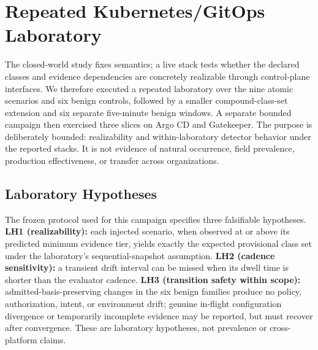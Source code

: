 \section{Repeated Kubernetes/GitOps Laboratory}
\label{sec:lab}

The closed-world study fixes semantics; a live stack tests whether the
declared classes and evidence dependencies are concretely realizable through
control-plane interfaces. We therefore executed a repeated laboratory over
the nine atomic scenarios and six benign controls, followed by a smaller
compound-class-set extension and six separate five-minute benign windows. A
separate bounded campaign then exercised three slices on Argo CD and
Gatekeeper. The purpose is deliberately bounded: realizability and
within-laboratory detector behavior under the reported stacks. It is not
evidence of natural occurrence, field prevalence,
production effectiveness, or transfer across organizations.

\subsection{Laboratory Hypotheses}
The frozen protocol used for this campaign specifies three falsifiable hypotheses.
\textbf{LH1 (realizability):} each injected scenario, when observed at or
above its predicted minimum evidence tier, yields exactly the expected
provisional class set under the laboratory's sequential-snapshot assumption.
\textbf{LH2 (cadence sensitivity):} a transient drift interval can
be missed when its dwell time is shorter than the evaluator cadence.
\textbf{LH3 (transition safety within scope):} admitted-basis-preserving
changes in the six benign families produce no policy, authorization, intent,
or environment drift; genuine in-flight configuration divergence or temporarily incomplete
evidence may be reported, but must recover after convergence. These are
laboratory hypotheses, not prevalence or cross-platform
claims.

